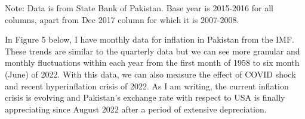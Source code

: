 \documentclass[12pt]{article}
\newcommand{\1}{\mathbbm 1}
\begin{document}
		\begin{table}[H]%
			\def\arraystretch{1}
			\begin{center}
				{\sc \caption{Annual National Inflation (December 2017 to December 2021)}}
				\begin{adjustbox}{width=0.8\textwidth}
					\setlength{\tabcolsep}{1pt}
				\end{adjustbox}
			\end{center}
			{\footnotesize{Note: Data is from State Bank of Pakistan. Base year is 2015-2016 for all columns, apart from Dec 2017 column for which it is 2007-2008.}} %
		\end{table}
		
		
			In Figure 5 below, I have monthly data for inflation in Pakistan from the IMF. These trends are similar to the quarterly data but we can see more granular and monthly fluctuations within each year from the first month of 1958 to six month (June) of 2022. With this data, we can also measure the effect of COVID shock and recent hyperinflation crisis of 2022. As I am writing, the current inflation crisis is evolving and Pakistan's exchange rate with respect to USA is finally appreciating since August 2022 after a period of extensive depreciation.
		
\end{document}

